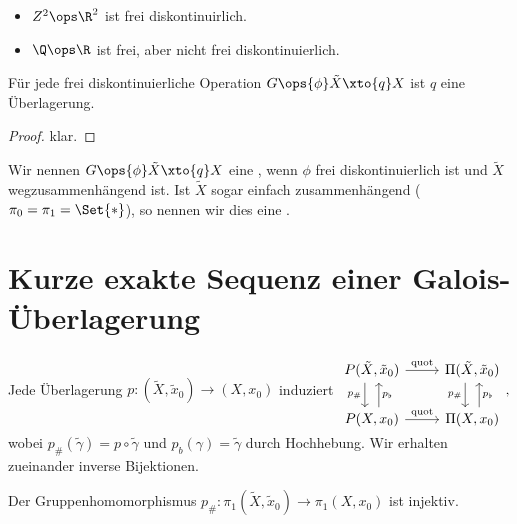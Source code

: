 \begin{ex}
    \begin{itemize}
        \item
            $Z^2 \ops \R^2$ ist frei diskontinuirlich.
        \item
            $\Q \ops \R$ ist frei, aber nicht frei diskontinuierlich.
    \end{itemize}
\end{ex}

\begin{st}
    Für jede frei diskontinuierliche Operation $G \ops{\phi} \tilde X \xto{q} X$ ist $q$ eine Überlagerung.
    \begin{proof}
        klar.
    \end{proof}
\end{st}

\begin{df}
    Wir nennen $G \ops{\phi} \tilde X \xto{q} X$ eine , wenn $\phi$ frei diskontinuierlich ist und $\tilde X$ wegzusammenhängend ist.
    Ist $\tilde X$ sogar einfach zusammenhängend ($\pi_0 = \pi_1 = \Set{*}$), so nennen wir dies eine .
\end{df}


\section{Kurze exakte Sequenz einer Galois-Überlagerung}


\begin{st}
    Jede Überlagerung $p: (\tilde X, \tilde x_0) \to (X, x_0)$ induziert
    \begin{math}
        \begin{tikzcd}
            P(\tilde X, \tilde x_0) \ar[d,"p_\#",xshift=-0.5em,swap] \ar[r,"\quot"] & \Pi(\tilde X, \tilde x_0) \ar[d,"p_\#",xshift=-0.5em,swap] \\
            P(X, x_0) \ar[u,"p_\b",xshift=0.5em,swap] \ar[r,"\quot"] & \Pi(X, x_0) \ar[u, "p_\b",xshift=0.5em,swap]
        \end{tikzcd},
    \end{math}
    wobei $p_\#(\tilde \gamma) = p \circ \tilde \gamma$ und $p_b(\gamma) = \tilde \gamma$ durch Hochhebung.
    Wir erhalten zueinander inverse Bijektionen.
\end{st}

\begin{kor}
    Der Gruppenhomomorphismus $p_\#: \pi_1(\tilde X, \tilde x_0) \to \pi_1(X, x_0)$ ist injektiv.
\end{kor}

